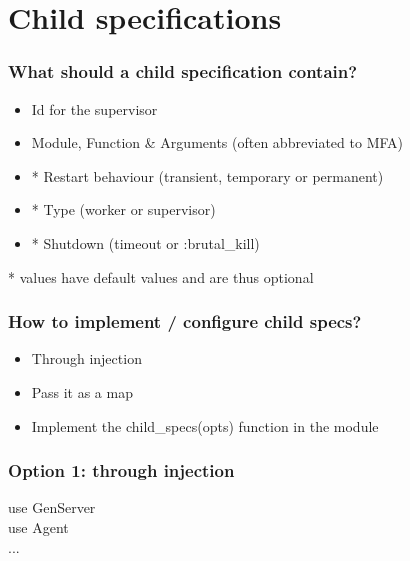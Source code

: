 \section{Child specifications}

\frame{\tableofcontents[currentsection]}


\begin{frame}
    \frametitle{What should a child specification contain?}
    \begin{itemize}
        \item Id for the supervisor
        \item Module, Function \& Arguments (often abbreviated to MFA)
        \item * Restart behaviour (transient, temporary or permanent)
        \item * Type (worker or supervisor)
        \item * Shutdown (timeout or :brutal\_kill)
    \end{itemize}

    \vfill

    \footnotesize
    * values have default values and are thus optional
\end{frame}

\begin{frame}
    \frametitle{How to implement / configure child specs?}
    \begin{itemize}
        \item Through injection
        \item Pass it as a map
        \item Implement the child\_specs(opts) function in the module
    \end{itemize}
\end{frame}

\begin{frame}
    \frametitle{Option 1: through injection}
    \begin{center}
        use GenServer \\
        use Agent \\
        ...
    \end{center}
\end{frame}

